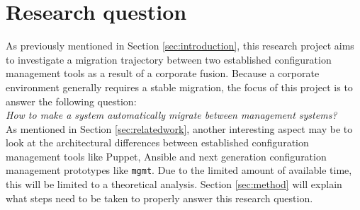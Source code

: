 \section{Research question}\label{sec:researchquestion}
As previously mentioned in Section \ref{sec:introduction}, this research project aims to investigate a migration trajectory between two established configuration management tools as a result of a corporate fusion. Because a corporate environment generally requires a stable migration, the focus of this project is to answer the following question:
\\
\textit{How to make a system automatically migrate between management systems?}
\\
As mentioned in Section \ref{sec:relatedwork}, another interesting aspect may be to look at the architectural differences between established configuration management tools like Puppet, Ansible and next generation configuration management prototypes like \texttt{mgmt}. Due to the limited amount of available time, this will be limited to a theoretical analysis. Section \ref{sec:method} will explain what steps need to be taken to properly answer this research question.
